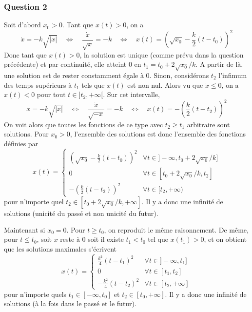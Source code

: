 \hypertarget{answer-tor-2}{%
\subsubsection*{Question 2}\label{answer-tor-2}}


Soit d'abord \(x_0>0\). Tant que \(x(t)>0\), on a \[
\dot{x}=-k\sqrt{|x|} \quad \Leftrightarrow \quad \frac{\dot{x}}{\sqrt{x}}=-k  \quad \Leftrightarrow \quad x(t) = \left(\sqrt{x_0}-\frac{k}{2}(t-t_0)\right)^2
\] Donc tant que \(x(t)>0\), la solution est unique (comme prévu dans la
question précédente) et par continuité, elle atteint 0 en
\(t_1=t_0+2\sqrt{x_0}/k\). A partir de là, une solution est de rester
constamment égale à 0. Sinon, considérons \(t_2\) l'infimum des temps
supérieurs à \(t_1\) tels que \(x(t)\) est non nul. Alors vu que
\(\dot{x}\leq 0\), on a \(x(t)< 0\) pour tout \(t\in ]t_2,+\infty[\).
Sur cet intervalle, \[
\dot{x}=-k\sqrt{|x|} \quad \Leftrightarrow \quad \frac{\dot{x}}{\sqrt{-x}}=-k  \quad \Leftrightarrow \quad x(t) = -\left(\frac{k}{2}(t-t_2)\right)^2
\] On voit alors que toutes les fonctions de ce type avec
\(t_2\geq t_1\) arbitraire sont solutions. Pour \(x_0>0\), l'ensemble
des solutions est donc l'ensemble des fonctions définies par \[
x(t)= 
\left\{
\begin{array}{ll}
\left(\sqrt{x_0}-\frac{k}{2}(t-t_0)\right)^2 & \forall t\in ]-\infty,t_0+2\sqrt{x_0}/k] \\
0 & \forall t\in [t_0+2\sqrt{x_0}/k,t_2] \\
-\left(\frac{k}{2}(t-t_2)\right)^2 & \forall t\in [t_2,+\infty)
\end{array}
\right.
\] pour n'importe quel \(t_2\in [t_0+2\sqrt{x_0}/k,+\infty]\). Il y a
donc une infinité de solutions (unicité du passé et non unicité du
futur).

Maintenant si \(x_0=0\). Pour \(t\geq t_0\), on reproduit le même
raisonnement. De même, pour \(t\leq t_0\), soit \(x\) reste à 0 soit il
existe \(t_1 < t_0\) tel que \(x(t_1)>0\), et on obtient que les
solutions maximales s'écrivent \[
x(t)= 
\left\{
\begin{array}{ll}
\frac{k^2}{4}(t-t_1)^2 & \forall t\in ]-\infty,t_1] \\
0 & \forall t\in [t_1,t_2]\\
-\frac{k^2}{4}(t-t_2)^2 & \forall t\in [t_2,+\infty]
\end{array}
\right.
\] pour n'importe quels \(t_1 \in [-\infty,t_0]\) et
\(t_2 \in [t_0,+\infty]\). Il y a donc une infinité de solutions (à la
fois dans le passé et le futur).

